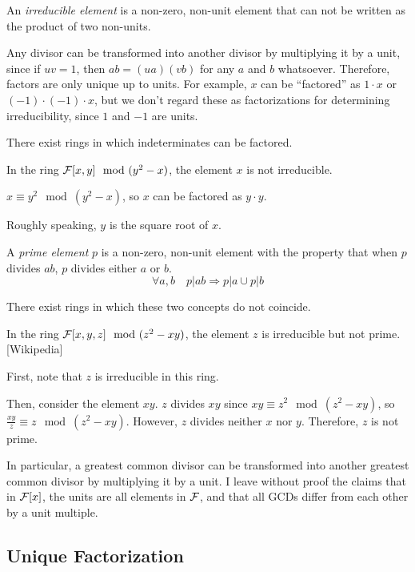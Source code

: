 \begin{key point}
An {\it irreducible element} is a non-zero, non-unit element
that can not be written as the product of two non-units.
\end{key point}

Any divisor can be transformed into another divisor by multiplying it
by a unit, since if $uv=1$, then $ab=(ua)(vb)$ for any $a$ and $b$
whatsoever.  Therefore, factors are only unique up to units.  For
example, $x$ can be ``factored'' as $1 \cdot x$ or $(-1)\cdot(-1)\cdot x$,
but we don't regard these as factorizations for
determining irreducibility, since $1$ and $-1$ are units.

There exist rings in which indeterminates can be factored.

\example
In the ring ${\cal F}[x,y] \mod (y^2-x)$, the element $x$ is
not irreducible.

$x \equiv y^2 \mod (y^2-x)$, so $x$ can be factored as
$y\cdot y$.

Roughly speaking, $y$ is the square root of $x$.
\endexample

\begin{key point}
A {\it prime element} $p$ is a non-zero, non-unit element with
the property that when $p$ divides $ab$, $p$ divides either $a$ or $b$.
$$\forall a,b \quad p|ab \Rightarrow p|a \cup p|b$$
\end{key point}

There exist rings in which these two concepts do not coincide.

\example
In the ring ${\cal F}[x,y,z] \mod (z^2-xy)$, the element $z$ is
irreducible but not prime.  [Wikipedia]

First, note that $z$ is irreducible in this ring.

Then, consider the element $xy$.  $z$ divides $xy$ since
$xy \equiv z^2 \mod (z^2-xy)$, so $\frac{xy}{z} \equiv z \mod (z^2-xy)$.
However, $z$ divides neither $x$ nor $y$.
Therefore, $z$ is not prime.
\endexample



In particular, a greatest common divisor can be transformed into
another greatest common divisor by multiplying it by a unit.  I leave
without proof the claims that in ${\cal F}[x]$, the units are all
elements in ${\cal F}$, and that all GCDs differ from each other by a
unit multiple.

\subsection*{\qquad Unique Factorization}

